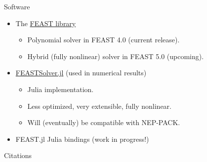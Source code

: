 \documentclass[mathserif, xcolor=table]{beamer}
\begin{document}
\begin{frame}{Software}
	\begin{itemize}
		\item The \href{http://http://www.ecs.umass.edu/~polizzi/feast/}{FEAST library} 
			\vspace{0.5em}
			\begin{itemize}
				\item Polynomial solver in FEAST 4.0 (current release).
					\vspace{0.5em}
				\item Hybrid (fully nonlinear) solver in FEAST 5.0 (upcoming).
			\end{itemize}
		\vspace{1em}
	\item \href{https://github.com/spacedome/FEASTSolver.jl}{FEASTSolver.jl} (used in numerical results)
		\vspace{0.5em}
		\begin{itemize}
			\item Julia implementation.
				\vspace{0.5em}
			\item Less optimized, very extensible, fully nonlinear.
				\vspace{0.5em}
			\item Will (eventually) be compatible with NEP-PACK.
		\end{itemize}
		\vspace{1em}
		\item FEAST.jl Julia bindings (work in progress!)
	\end{itemize}
\end{frame}

\begin{frame}{Citations}
	
	
\end{frame}
\end{document}
